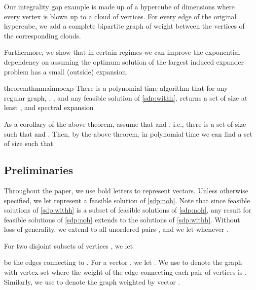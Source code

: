\documentclass[11pt]{article}
\begin{document}
Our integrality gap example is made up of a hypercube of  dimensions where every vertex is blown up to a cloud of  vertices. For every edge of the original hypercube, we add a complete bipartite graph of weight  between the vertices of the corresponding clouds.





Furthermore, we show that in certain regimes we can improve the exponential dependency on  assuming the optimum solution of the largest induced expander problem has a small (outside) expansion. \begin{restatable}{theorem}{thmmainnoexp}
\label{thm:mainwithoutsideexpansion}
	There is a polynomial time algorithm that for any -regular graph, , , and any feasible solution  of \ref{sdp:withh}, returns a set  of size at least , and spectral expansion
	
\end{restatable}
As a corollary of the above theorem, assume that  and , i.e., there is a set  of size  such that  and . Then, by the above theorem, in polynomial time we can find a set  of size  such that

























\subsection{Preliminaries}
Throughout the paper, we use bold letters to represent vectors. 
Unless otherwise specified, we let  
represent a feasible solution of \ref{sdp:noh}. Note that since feasible solutions of \ref{sdp:withh} is a subset of feasible solutions of \ref{sdp:noh}, any result for feasible solutions of \ref{sdp:noh} extends to the solutions of \ref{sdp:withh}.
Without loss of generality, we extend  to all unordered pairs , and we let   whenever .

For two disjoint subsets of vertices , we let 

be the edges connecting  to .
For a vector , we let  
. 
We use  to denote the  graph with vertex set  where the weight of the edge connecting each pair of vertices  is .
Similarly, we use  to denote the graph weighted by vector . 
\end{document}
